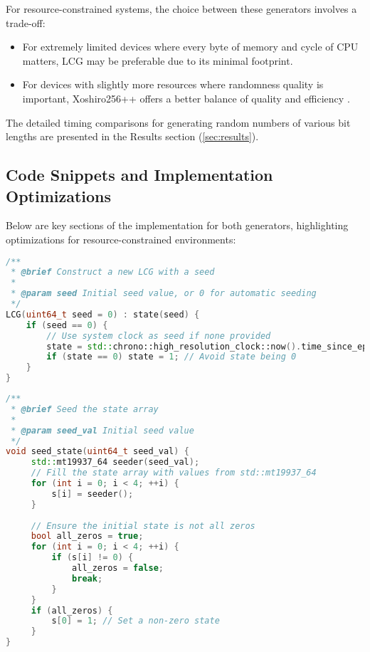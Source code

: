 For resource-constrained systems, the choice between these generators involves a trade-off:

\begin{itemize}
    \item For extremely limited devices where every byte of memory and cycle of CPU matters, LCG may be preferable due to its minimal footprint.
    
    \item For devices with slightly more resources where randomness quality is important, Xoshiro256++ offers a better balance of quality and efficiency \cite{prng_iot}.
\end{itemize}

The detailed timing comparisons for generating random numbers of various bit lengths are presented in the Results section (\autoref{sec:results}).

\subsection{Code Snippets and Implementation Optimizations}

Below are key sections of the implementation for both generators, highlighting optimizations for resource-constrained environments:

\begin{lstlisting}[language=C++, caption=LCG Constructor Implementation]
/**
 * @brief Construct a new LCG with a seed
 * 
 * @param seed Initial seed value, or 0 for automatic seeding
 */
LCG(uint64_t seed = 0) : state(seed) {
    if (seed == 0) {
        // Use system clock as seed if none provided
        state = std::chrono::high_resolution_clock::now().time_since_epoch().count();
        if (state == 0) state = 1; // Avoid state being 0
    }
}
\end{lstlisting}

\begin{lstlisting}[language=C++, caption=Xoshiro256++ Seeding Implementation]
/**
 * @brief Seed the state array
 * 
 * @param seed_val Initial seed value
 */
void seed_state(uint64_t seed_val) {
     std::mt19937_64 seeder(seed_val);
     // Fill the state array with values from std::mt19937_64
     for (int i = 0; i < 4; ++i) {
         s[i] = seeder();
     }
     
     // Ensure the initial state is not all zeros
     bool all_zeros = true;
     for (int i = 0; i < 4; ++i) {
         if (s[i] != 0) {
             all_zeros = false;
             break;
         }
     }
     if (all_zeros) {
         s[0] = 1; // Set a non-zero state
     }
}
\end{lstlisting}

